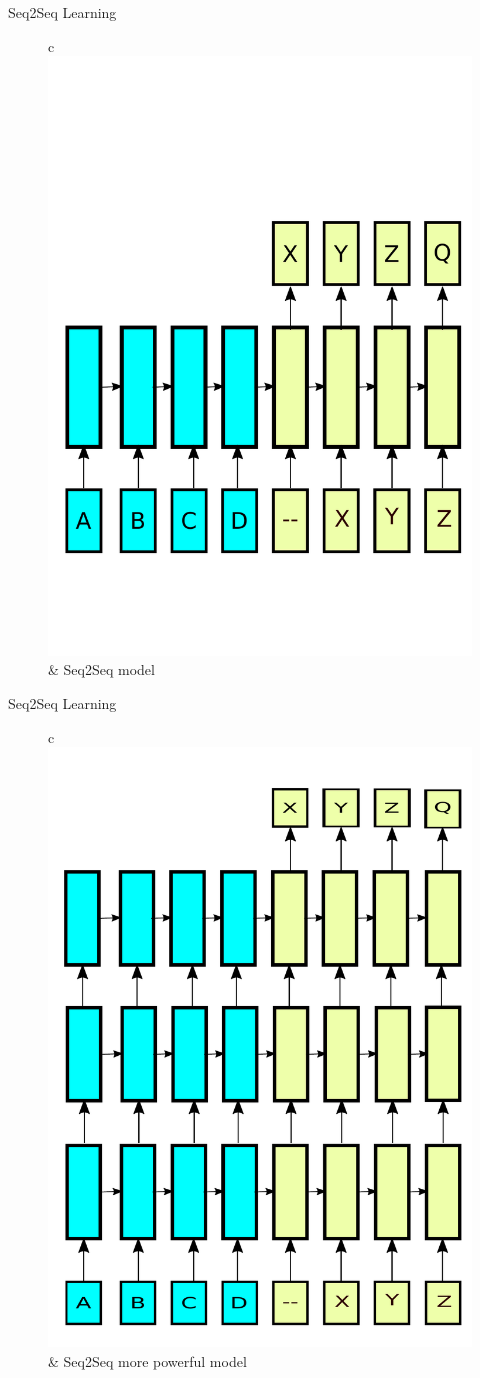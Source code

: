 ﻿\documentclass[table,aspectratio=43,mathserif,xcolor={usenames,dvipsnames,svgnames,table},10pt]{beamer}
\renewcommand{\footnotesize}{\tiny}
\begin{document}
\begin{frame}{Seq2Seq Learning}
 \begin{figure}
    \centering
    \begin{tabular}{c}
	\includegraphics[width=.49\linewidth]{images/seq2seq.pdf} &
	\footnotesize Seq2Seq model \\
    \end{tabular}
    \end{figure}
\end{frame}

\begin{frame}{Seq2Seq Learning}
 \begin{figure}
    \centering
    \begin{tabular}{c}
	\includegraphics[width=.49\linewidth]{images/seq2seq_deep.pdf} &
	\footnotesize Seq2Seq more powerful model \\
    \end{tabular}
    \end{figure}
\end{frame}
\end{document}
